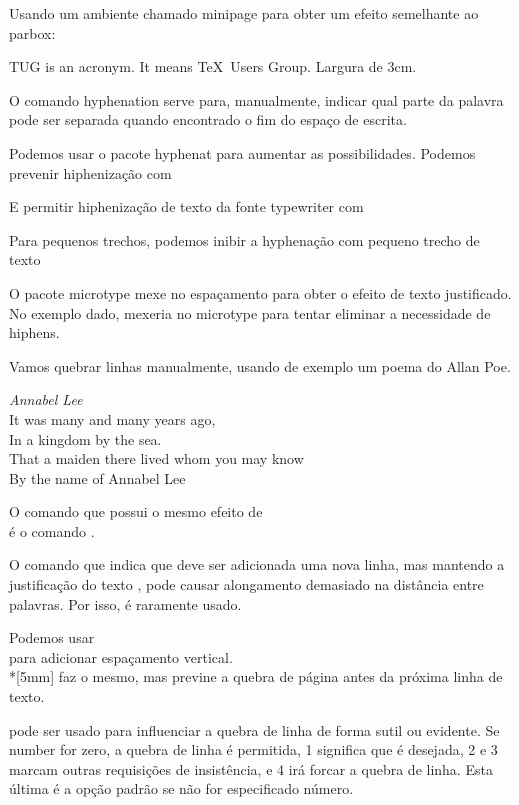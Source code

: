 \documentclass{article}
\begin{document}
Usando um ambiente chamado minipage para obter um efeito semelhante ao parbox:

\begin{minipage}{3cm}

    TUG is an acronym. It means \TeX\ Users Group. Largura de 3cm.

\end{minipage}

O comando hyphenation serve para, manualmente, indicar qual parte da palavra pode ser separada quando encontrado o fim do espaço de escrita.

Podemos usar o pacote hyphenat para aumentar as possibilidades.
Podemos prevenir hiphenização com
\usepackage[none]{hyphenat}
E permitir hiphenização de texto da fonte typewriter com
\usepackage[htt]{hyphenat}

Para pequenos trechos, podemos inibir a hyphenação com \nohyphens{pequeno trecho de texto}

O pacote microtype mexe no espaçamento para obter o efeito de texto justificado.
No exemplo dado, mexeria no microtype para tentar eliminar a necessidade de hiphens.

Vamos quebrar linhas manualmente, usando de exemplo um poema do Allan Poe.

\emph{Annabel Lee} \\[3mm]
It was many and many years ago, \\
In a kingdom by the sea. \\
That a maiden there lived whom you may know \\
By the name of Annabel Lee

O comando que possui o mesmo efeito de \\
é o comando \newline.

O comando que indica que deve ser adicionada uma nova linha,
mas mantendo a justificação do texto \linebreak, pode causar
alongamento demasiado na distância entre palavras.
Por isso, é raramente usado.

Podemos usar \\[3mm] para adicionar espaçamento vertical.
\\*[5mm] faz o mesmo, mas previne a quebra de página antes da
próxima linha de texto.

\linebreak[number] pode ser usado para influenciar a quebra de linha de forma sutil ou evidente.
Se number for zero, a quebra de linha é permitida, 1 significa que é desejada, 2 e 3 marcam outras requisições de insistência, e 4 irá forcar a quebra de linha.
Esta última é a opção padrão se não for especificado número.
\end{document}
